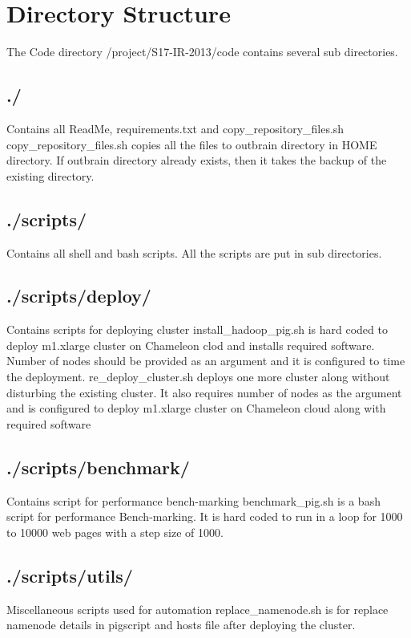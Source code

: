 \documentclass[9pt,twocolumn,twoside]{../../styles/osajnl}
\begin{document}
\section{Directory Structure}
The Code directory /project/S17-IR-2013/code contains several sub directories. 
\subsection{./} Contains all ReadMe, requirements.txt and copy\_repository\_files.sh
\newline copy\_repository\_files.sh copies all the files to outbrain directory in HOME directory. If outbrain directory already exists, then it takes the backup of the existing directory.
\subsection{./scripts/} Contains all shell and bash scripts. All the scripts are put in sub directories.
\subsection{./scripts/deploy/} Contains scripts for deploying cluster
\newline install\_hadoop\_pig.sh is hard coded to deploy m1.xlarge cluster on Chameleon clod and installs required software. Number of nodes should be provided as an argument and it is configured to time the deployment.
\newline re\_deploy\_cluster.sh deploys one more cluster along without disturbing the existing cluster. It also requires number of nodes as the argument and is configured to deploy m1.xlarge cluster on Chameleon cloud along with required software
\subsection{./scripts/benchmark/} Contains script for performance bench-marking
\newline benchmark\_pig.sh is a bash script for performance Bench-marking. It is hard coded to run in a loop for 1000 to 10000 web pages with a step size of 1000.
\subsection{./scripts/utils/} Miscellaneous scripts used for automation
\newline replace\_namenode.sh is for replace namenode details in pigscript and hosts file after deploying the cluster. 
\end{document}

